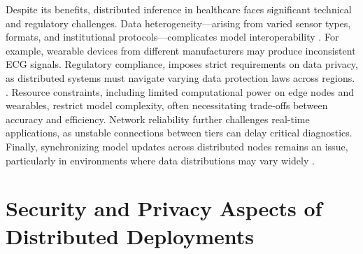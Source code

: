 \documentclass[conference]{IEEEtran}
\begin{document}
Despite its benefits, distributed inference in healthcare faces significant technical and regulatory challenges. Data heterogeneity—arising from varied sensor types, formats, and institutional protocols—complicates model interoperability \cite{akdemir2025technical}. For example, wearable devices from different manufacturers may produce inconsistent ECG signals. Regulatory compliance, imposes strict requirements on data privacy, as distributed systems must navigate varying data protection laws across regions. \cite{akdemir2025technical, tuli2020healthfog}. Resource constraints, including limited computational power on edge nodes and wearables, restrict model complexity, often necessitating trade-offs between accuracy and efficiency. Network reliability further challenges real-time applications, as unstable connections between tiers can delay critical diagnostics. Finally, synchronizing model updates across distributed nodes remains an issue, particularly in environments where data distributions may vary widely \cite{akdemir2025technical, al2022machine}.








\section{Security and Privacy Aspects of Distributed Deployments}
\end{document}
